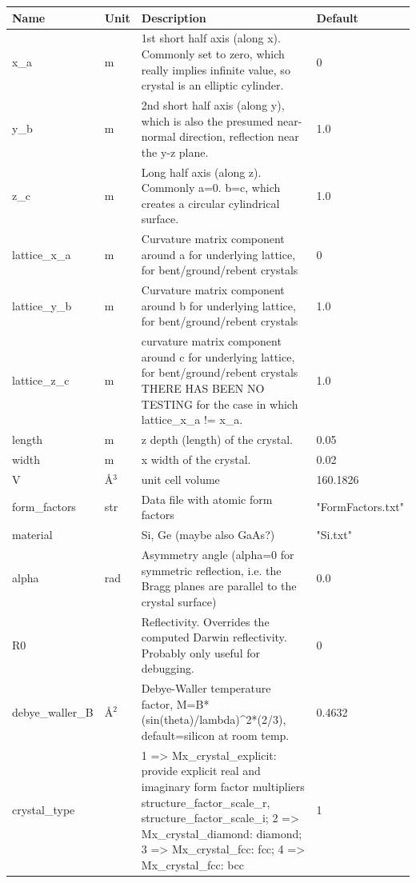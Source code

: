 \begin{longtable}{p{}p{}p{}p{}}
\toprule
\textbf{Name} & \textbf{Unit} & \textbf{Description} & \textbf{Default} \\
\midrule
\endhead
x\_a & m & 1st short half axis (along x). Commonly set to zero, which really implies infinite value, so crystal is an elliptic cylinder. & 0 \\
y\_b & m & 2nd short half axis (along y), which is also the presumed near-normal direction, reflection near the y-z plane. & 1.0 \\
z\_c & m & Long half axis (along z). Commonly a=0. b=c, which creates a circular cylindrical surface. & 1.0 \\
lattice\_x\_a & m & Curvature matrix component around a for underlying lattice, for bent/ground/rebent crystals & 0 \\
lattice\_y\_b & m & Curvature matrix component around b for underlying lattice, for bent/ground/rebent crystals & 1.0 \\
lattice\_z\_c & m & curvature matrix component around c for underlying lattice, for bent/ground/rebent crystals THERE HAS BEEN NO TESTING for the case in which lattice\_x\_a != x\_a. & 1.0 \\
length & m & z depth (length) of the crystal. & 0.05 \\
width & m & x width of the crystal. & 0.02 \\
V & \AA{}$^{3}$ & unit cell volume & 160.1826 \\
form\_factors & str & Data file with atomic form factors & "FormFactors.txt" \\
material &   & Si, Ge (maybe also GaAs?) & "Si.txt" \\
alpha & rad & Asymmetry angle (alpha=0 for symmetric reflection, i.e. the Bragg planes are parallel to the crystal surface) & 0.0 \\
R0 &   & Reflectivity. Overrides the computed Darwin reflectivity. Probably only useful for debugging. & 0 \\
debye\_waller\_B & \AA{}$^{2}$ & Debye-Waller temperature factor, M=B*(sin(theta)/lambda)\textasciicircum{}2*(2/3), default=silicon at room temp. & 0.4632 \\
crystal\_type &   & 1 =\textgreater{} Mx\_crystal\_explicit: provide explicit real and imaginary form factor multipliers structure\_factor\_scale\_r, structure\_factor\_scale\_i; 2 =\textgreater{} Mx\_crystal\_diamond: diamond; 3 =\textgreater{} Mx\_crystal\_fcc: fcc; 4 =\textgreater{} Mx\_crystal\_fcc: bcc & 1 \\

\end{longtable}
